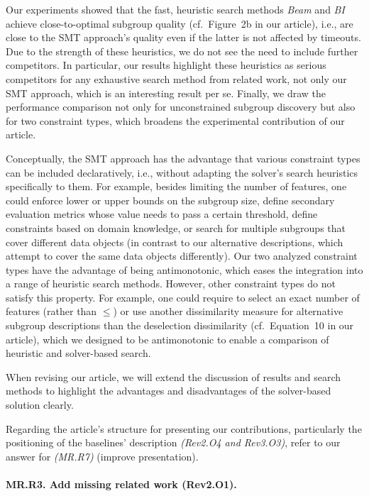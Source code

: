 \documentclass{article}
\begin{document}
Our experiments showed that the fast, heuristic search methods \emph{Beam} and \emph{BI} achieve close-to-optimal subgroup quality (cf.~Figure~2b in our article), i.e., are close to the SMT approach's quality even if the latter is not affected by timeouts.
Due to the strength of these heuristics, we do not see the need to include further competitors.
In particular, our results highlight these heuristics as serious competitors for any exhaustive search method from related work, not only our SMT approach, which is an interesting result per se.
Finally, we draw the performance comparison not only for unconstrained subgroup discovery but also for two constraint types, which broadens the experimental contribution of our article.

Conceptually, the SMT approach has the advantage that various constraint types can be included declaratively, i.e., without adapting the solver's search heuristics specifically to them.
For example, besides limiting the number of features, one could enforce lower or upper bounds on the subgroup size, define secondary evaluation metrics whose value needs to pass a certain threshold, define constraints based on domain knowledge, or search for multiple subgroups that cover different data objects (in contrast to our alternative descriptions, which attempt to cover the same data objects differently).
Our two analyzed constraint types have the advantage of being antimonotonic, which eases the integration into a range of heuristic search methods.
However, other constraint types do not satisfy this property.
For example, one could require to select an exact number of features (rather than $\leq$) or use another dissimilarity measure for alternative subgroup descriptions than the deselection dissimilarity (cf.~Equation~10 in our article), which we designed to be antimonotonic to enable a comparison of heuristic and solver-based search.

When revising our article, we will extend the discussion of results and search methods to highlight the advantages and disadvantages of the solver-based solution clearly.

Regarding the article's structure for presenting our contributions, particularly the positioning of the baselines' description \emph{(Rev2.O4 and Rev3.O3)}, refer to our answer for \emph{(MR.R7)} (improve presentation).

\paragraph{MR.R3. Add missing related work (Rev2.O1).}
\end{document}
